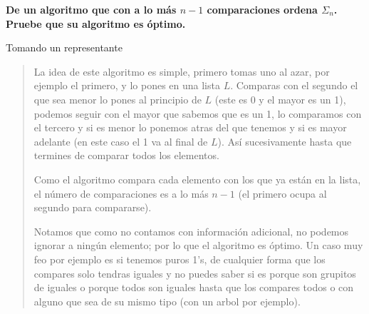 \textbf{De un algoritmo que con a lo más $n - 1$ comparaciones ordena $\Sigma_n$. Pruebe que su algoritmo es óptimo.}\vspace{.2cm}

\textcolor{bibi}{Tomando un representante}
\begin{quote}
    La idea de este algoritmo es simple, primero tomas uno al azar, por ejemplo el primero, y lo pones en una lista $L$. Comparas con el segundo el que sea menor lo pones al principio de $L$ (este es 0 y el mayor es un 1), podemos seguir con el mayor que sabemos que es un 1, lo comparamos con el tercero y si es menor lo ponemos atras del que tenemos y si es mayor adelante (en este caso el 1 va al final de $L$). Así sucesivamente hasta que termines de comparar todos los elementos.\vspace{.2cm}

    Como el algoritmo compara cada elemento con los que ya están en la lista, el número de comparaciones es a lo más $n - 1$ (el primero ocupa al segundo para compararse).\vspace{.2cm}

    Notamos que como no contamos con información adicional, no podemos ignorar a ningún elemento; por lo que el algoritmo es óptimo. Un caso muy feo por ejemplo es si tenemos puros 1's, de cualquier forma que los compares solo tendras iguales y no puedes saber si es porque son grupitos de iguales o porque todos son iguales hasta que los compares todos o con alguno que sea de su mismo tipo (con un arbol por ejemplo). \vspace{.2cm}
\end{quote}